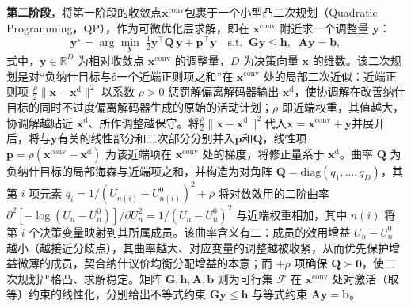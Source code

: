 \textbf{第二阶段}，将第一阶段的收敛点$\mathbf{x}^{\mathrm{conv}}$包裹于一个小型凸二次规划（Quadratic Programming，QP），作为可微优化层\citep{amosOptNetDifferentiableOptimization2021}求解，即在 $\mathbf{x}^{\mathrm{conv}}$ 附近求一个调整量 $\mathbf{y}$：
\begin{equation}
\mathbf{y}^{\star}=\arg\min_{\mathbf{y}}\;\tfrac{1}{2}\mathbf{y}^{\top}\mathbf{Q}\,\mathbf{y}+\mathbf{p}^{\top}\mathbf{y}
\quad\mathrm{s.t.}\;\;\mathbf{G}\mathbf{y}\le\mathbf{h},\;\;\mathbf{A}\mathbf{y}=\mathbf{b},
\label{eq.cohact.qp}
\end{equation}
式中，$\mathbf{y}\in\mathbb{R}^{D}$ 为相对收敛点 $\mathbf{x}^{\mathrm{conv}}$ 的调整量，$D$ 为决策向量 $\mathbf{x}$ 的维数。该二次规划是对“负纳什目标与∂一个近端正则项之和”在 $\mathbf{x}^{\mathrm{conv}}$ 处的局部二次近似：近端正则项 $\tfrac{\rho}{2}\lVert\mathbf{x}-\mathbf{x}^{\mathrm{d}}\rVert^{2}$ 以系数 $\rho>0$ 惩罚解偏离解码器输出 $\mathbf{x}^{\mathrm{d}}$，使协调解在改善纳什目标的同时不过度偏离解码器生成的原始的活动计划；$\rho$ 即近端权重，其值越大，协调解越贴近 $\mathbf{x}^{\mathrm{d}}$、所作调整越保守。将$\frac{\rho}{2}\|\mathbf{x}-\mathbf{x}^{\mathrm d}\|^2$代入$\mathbf{x}=\mathbf{x}^{\mathrm{conv}}+\mathbf{y}$并展开后，将与$\mathbf{y}$有关的线性部分和二次部分分别并入$\mathbf{p}$和$\mathbf{Q}$，线性项 $\mathbf{p}=\rho(\mathbf{x}^{\mathrm{conv}}-\mathbf{x}^{\mathrm{d}})$ 为该近端项在 $\mathbf{x}^{\mathrm{conv}}$ 处的梯度，将修正量系于 $\mathbf{x}^{\mathrm{d}}$。曲率 $\mathbf{Q}$ 为负纳什目标的局部海森与近端项之和，并构造为对角阵 $\mathbf{Q}=\mathrm{diag}(q_1,\dots,q_D)$，其第 $i$ 项元素 $q_i=1/(U_{n(i)}-U_{n(i)}^{0})^{2}+\rho$ 将对数效用的二阶曲率 $\partial^2[-\log(U_n-U_n^{0})]/\partial U_n^{2}=1/(U_n-U_n^{0})^{2}$ 与近端权重相加，其中 $n(i)$ 将第 $i$ 个决策变量映射到其所属成员。该曲率含义有二：成员的效用增益 $U_n-U_n^{0}$ 越小（越接近分歧点），其曲率越大、对应变量的调整越被收紧，从而优先保护增益微薄的成员，契合纳什议价均衡分配增益的本意；而 $+\rho$ 项确保 $\mathbf{Q}\succ\mathbf{0}$，使二次规划严格凸、求解稳定。矩阵 $\mathbf{G},\mathbf{h},\mathbf{A},\mathbf{b}$ 则为可行集 $\mathcal{F}$ 在 $\mathbf{x}^{\mathrm{conv}}$ 处对激活（取等）约束的线性化，分别给出不等式约束 $\mathbf{G}\mathbf{y}\le\mathbf{h}$ 与等式约束 $\mathbf{A}\mathbf{y}=\mathbf{b}$。

